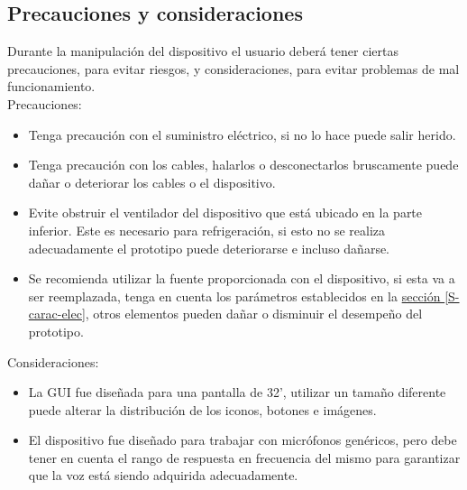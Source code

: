 \documentclass[11pt,lettersize]{article} %
\newcommand{\seccion}[1]{\hyperref[{#1}]{sección \ref*{#1}}}
\begin{document}
\subsection{Precauciones y consideraciones}
Durante la manipulación del dispositivo el usuario deberá tener ciertas precauciones, para evitar riesgos, y consideraciones, para evitar problemas de mal funcionamiento. \\
Precauciones:
\begin{itemize}
	\item Tenga precaución con el suministro eléctrico, si no lo hace puede salir herido.
	\item Tenga precaución con los cables, halarlos o desconectarlos bruscamente puede dañar o deteriorar los cables o el dispositivo.
	\item Evite obstruir el ventilador del dispositivo que está ubicado en la parte inferior. Este es necesario para refrigeración, si esto no se realiza adecuadamente el prototipo puede deteriorarse e incluso dañarse.
	\item Se recomienda utilizar la fuente proporcionada con el dispositivo, si esta va a ser reemplazada, tenga en cuenta los parámetros establecidos en la \seccion{S-carac-elec}, otros elementos pueden dañar o disminuir el desempeño del prototipo.
\end{itemize}
Consideraciones:
\begin{itemize}
	\item La GUI fue diseñada para una pantalla de 32', utilizar un tamaño diferente puede alterar la distribución de los iconos, botones e imágenes.
	\item El dispositivo fue diseñado para trabajar con micrófonos genéricos, pero debe tener en cuenta el rango de respuesta en frecuencia del mismo para garantizar que la voz está siendo adquirida adecuadamente.
\end{itemize}

\end{document}
